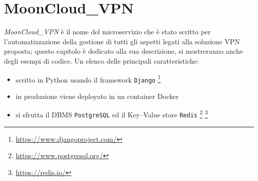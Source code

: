 \chapter{MoonCloud\_VPN}\label{ch:microservice}
\textit{MoonCloud\_VPN} è il nome del microservizio
che è stato scritto per l'automatizzazione della gestione di tutti gli aspetti legati
alla soluzione VPN proposta; questo capitolo è dedicato alla sua descrizione, si
mostreranno anche degli esempi di codice.
Un elenco delle principali caratteristiche:
\begin{itemize}
  \item scritto in Python usando il framework \texttt{Django}
  \footnote{\url{https://www.djangoproject.com/}}
  \item in produzione viene deployato in un container Docker
  \item si sfrutta il DBMS \texttt{PostgreSQL} ed il Key--Value store \texttt{Redis}
  \footnote{\url{https://www.postgresql.org/}} \footnote{\url{https://redis.io/}}
\end{itemize}






